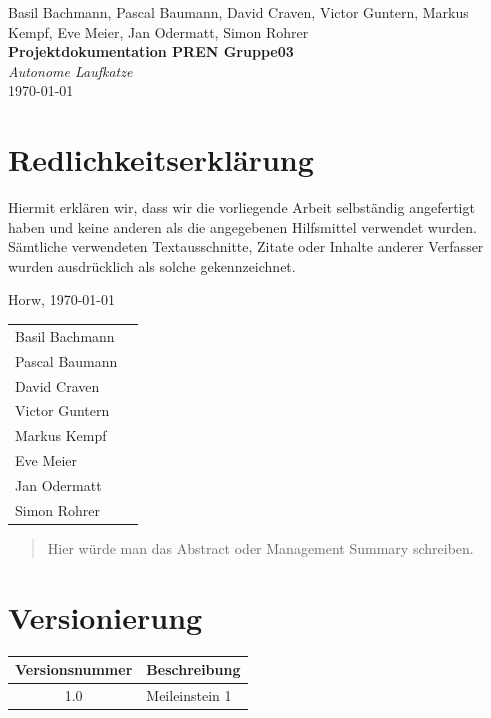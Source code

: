\documentclass[a4paper]{report}
\newcommand*{\titleAP}{\begingroup %
	\centering
	\vspace*{\baselineskip} %

	{Basil Bachmann, Pascal Baumann, David Craven, Victor Guntern, Markus Kempf, Eve Meier, Jan Odermatt, Simon Rohrer}\\[0.167\textheight] %

	{\Huge\bfseries Projektdokumentation PREN Gruppe03}\\[\baselineskip]

	{\Large \textit{Autonome Laufkatze}}\\
	\today

	\vspace*{3\baselineskip} %
	\endgroup}
\begin{document}

\titleAP

\newpage

\chapter*{Redlichkeitserklärung}
Hiermit erklären wir, dass wir die vorliegende Arbeit selbständig angefertigt haben und keine anderen als die angegebenen Hilfsmittel verwendet wurden. Sämtliche verwendeten Textausschnitte, Zitate oder Inhalte anderer Verfasser wurden ausdrücklich als solche gekennzeichnet.

\vspace{1.5em}

\noindent
Horw, \today

\vspace{2em}

\noindent
\begin{tabular}{lp{}}
	Basil Bachmann & \\[1em]
	\cline{2-2}
	Pascal Baumann &  \\[1em]
	\cline{2-2}
	David Craven & \\[1em]
	\cline{2-2}
	Victor Guntern & \\[1em]
	\cline{2-2}
	Markus Kempf & \\[1em]
	\cline{2-2}
	Eve Meier & \\[1em]
	\cline{2-2}
	Jan Odermatt & \\[1em]
	\cline{2-2}
	Simon Rohrer &  \\[1em]
	\cline{2-2}
\end{tabular}

\newpage

\begin{abstract}
	Hier würde man das Abstract oder Management Summary schreiben.
\end{abstract}

\chapter*{Versionierung}
\vspace{2em}

\noindent
\begin{tabular}{|c|p{}|}
	\hline
	\textbf{Versionsnummer} & \textbf{Beschreibung}\\
	\hline
	1.0 & Meileinstein 1 \\
	\hline
\end{tabular}
\end{document}
